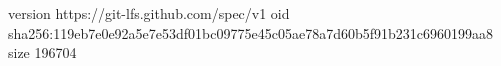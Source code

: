 version https://git-lfs.github.com/spec/v1
oid sha256:119eb7e0e92a5e7e53df01bc09775e45c05ae78a7d60b5f91b231c6960199aa8
size 196704
